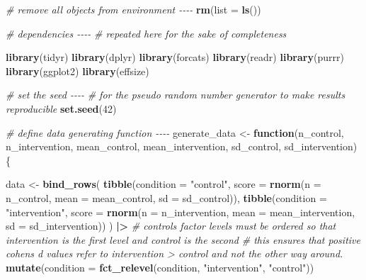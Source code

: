\documentclass[
]{article}
\newenvironment{Shaded}{\begin{snugshade}}{\end{snugshade}}
\newcommand{\AttributeTok}[1]{\textcolor[rgb]{0.13,0.29,0.53}{#1}}
\newcommand{\CommentTok}[1]{\textcolor[rgb]{0.56,0.35,0.01}{\textit{#1}}}
\newcommand{\ControlFlowTok}[1]{\textcolor[rgb]{0.13,0.29,0.53}{\textbf{#1}}}
\newcommand{\DecValTok}[1]{\textcolor[rgb]{0.00,0.00,0.81}{#1}}
\newcommand{\FunctionTok}[1]{\textcolor[rgb]{0.13,0.29,0.53}{\textbf{#1}}}
\newcommand{\NormalTok}[1]{#1}
\newcommand{\OtherTok}[1]{\textcolor[rgb]{0.56,0.35,0.01}{#1}}
\newcommand{\SpecialCharTok}[1]{\textcolor[rgb]{0.81,0.36,0.00}{\textbf{#1}}}
\newcommand{\StringTok}[1]{\textcolor[rgb]{0.31,0.60,0.02}{#1}}
\begin{document}
\begin{Shaded}
\begin{Highlighting}[]
\CommentTok{\# remove all objects from environment {-}{-}{-}{-}}
\FunctionTok{rm}\NormalTok{(}\AttributeTok{list =} \FunctionTok{ls}\NormalTok{())}


\CommentTok{\# dependencies {-}{-}{-}{-}}
\CommentTok{\# repeated here for the sake of completeness }

\FunctionTok{library}\NormalTok{(tidyr)}
\FunctionTok{library}\NormalTok{(dplyr)}
\FunctionTok{library}\NormalTok{(forcats)}
\FunctionTok{library}\NormalTok{(readr)}
\FunctionTok{library}\NormalTok{(purrr) }
\FunctionTok{library}\NormalTok{(ggplot2)}
\FunctionTok{library}\NormalTok{(effsize)}


\CommentTok{\# set the seed {-}{-}{-}{-}}
\CommentTok{\# for the pseudo random number generator to make results reproducible}
\FunctionTok{set.seed}\NormalTok{(}\DecValTok{42}\NormalTok{)}


\CommentTok{\# define data generating function {-}{-}{-}{-}}
\NormalTok{generate\_data }\OtherTok{\textless{}{-}} \ControlFlowTok{function}\NormalTok{(n\_control,}
\NormalTok{                          n\_intervention,}
\NormalTok{                          mean\_control,}
\NormalTok{                          mean\_intervention,}
\NormalTok{                          sd\_control,}
\NormalTok{                          sd\_intervention) \{}
  
\NormalTok{  data }\OtherTok{\textless{}{-}} 
    \FunctionTok{bind\_rows}\NormalTok{(}
      \FunctionTok{tibble}\NormalTok{(}\AttributeTok{condition =} \StringTok{"control"}\NormalTok{,}
             \AttributeTok{score =} \FunctionTok{rnorm}\NormalTok{(}\AttributeTok{n =}\NormalTok{ n\_control, }\AttributeTok{mean =}\NormalTok{ mean\_control, }\AttributeTok{sd =}\NormalTok{ sd\_control)),}
      \FunctionTok{tibble}\NormalTok{(}\AttributeTok{condition =} \StringTok{"intervention"}\NormalTok{,}
             \AttributeTok{score =} \FunctionTok{rnorm}\NormalTok{(}\AttributeTok{n =}\NormalTok{ n\_intervention, }\AttributeTok{mean =}\NormalTok{ mean\_intervention, }\AttributeTok{sd =}\NormalTok{ sd\_intervention))}
\NormalTok{    ) }\SpecialCharTok{|\textgreater{}}
    \CommentTok{\# control\textquotesingle{}s factor levels must be ordered so that intervention is the first level and control is the second}
    \CommentTok{\# this ensures that positive cohen\textquotesingle{}s d values refer to intervention \textgreater{} control and not the other way around.}
    \FunctionTok{mutate}\NormalTok{(}\AttributeTok{condition =} \FunctionTok{fct\_relevel}\NormalTok{(condition, }\StringTok{"intervention"}\NormalTok{, }\StringTok{"control"}\NormalTok{))}
  

\end{Highlighting}
\end{Shaded}
\end{document}

